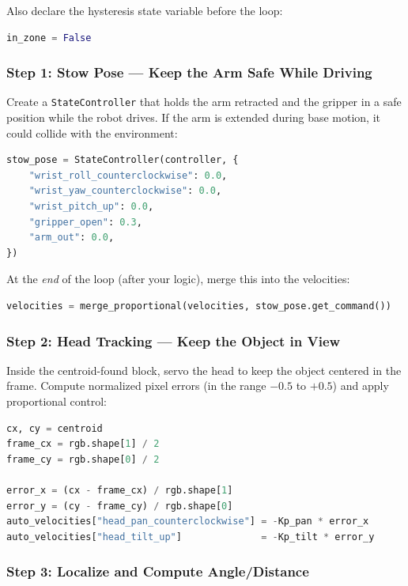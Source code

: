 \documentclass[11pt,a4paper]{article}
\begin{document}
Also declare the hysteresis state variable before the loop:

\begin{lstlisting}[language=Python]
in_zone = False
\end{lstlisting}

\subsubsection*{Step 1: Stow Pose --- Keep the Arm Safe While Driving}

Create a \texttt{StateController} that holds the arm retracted and the gripper in a safe position while the robot drives. If the arm is extended during base motion, it could collide with the environment:

\begin{lstlisting}[language=Python]
stow_pose = StateController(controller, {
    "wrist_roll_counterclockwise": 0.0,
    "wrist_yaw_counterclockwise": 0.0,
    "wrist_pitch_up": 0.0,
    "gripper_open": 0.3,
    "arm_out": 0.0,
})
\end{lstlisting}

At the \emph{end} of the loop (after your logic), merge this into the velocities:

\begin{lstlisting}[language=Python]
velocities = merge_proportional(velocities, stow_pose.get_command())
\end{lstlisting}

\subsubsection*{Step 2: Head Tracking --- Keep the Object in View}

Inside the centroid-found block, servo the head to keep the object centered in the frame. Compute normalized pixel errors (in the range $-0.5$ to $+0.5$) and apply proportional control:

\begin{lstlisting}[language=Python]
cx, cy = centroid
frame_cx = rgb.shape[1] / 2
frame_cy = rgb.shape[0] / 2

error_x = (cx - frame_cx) / rgb.shape[1]
error_y = (cy - frame_cy) / rgb.shape[0]
auto_velocities["head_pan_counterclockwise"] = -Kp_pan * error_x
auto_velocities["head_tilt_up"]              = -Kp_tilt * error_y
\end{lstlisting}

\subsubsection*{Step 3: Localize and Compute Angle/Distance}
\end{document}
